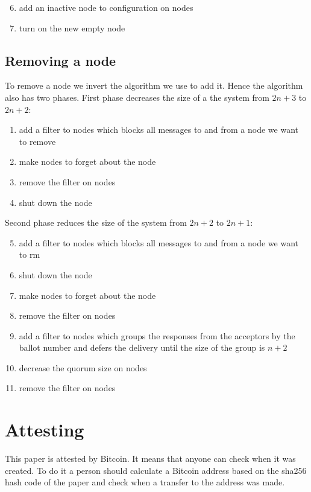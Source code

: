 \documentclass[12pt]{article}
\begin{document}
\begin{enumerate} \setcounter{enumi}{5}
\item add an inactive node to configuration on nodes
\item turn on the new empty node
\end{enumerate}


\subsection{Removing a node}

To remove a node we invert the algorithm we use to add it. Hence the algorithm also has two phases. First phase decreases the size of a the system from $2n+3$ to $2n+2$:

\begin{enumerate}
\item add a filter to nodes which blocks all messages to and from a node we want to remove
\item make nodes to forget about the node
\item remove the filter on nodes
\item shut down the node
\end{enumerate}

{\noindent Second phase reduces the size of the system from $2n+2$ to $2n+1$:}

\begin{enumerate} \setcounter{enumi}{4}
\item add a filter to nodes which blocks all messages to and from a node we want to rm
\item shut down the node
\item make nodes to forget about the node
\item remove the filter on nodes
\item add a filter to nodes which groups the responses from the acceptors by the ballot number and defers the delivery until the size of the group is $n+2$
\item decrease the quorum size on nodes
\item remove the filter on nodes
\end{enumerate}

\newpage

\section*{\hypertarget{attest}{Attesting}}

This paper is attested by Bitcoin. It means that anyone can check when it was created. To do it a person should calculate a Bitcoin address based on the sha256 hash code of the paper and check when a transfer to the address was made.
\end{document}
